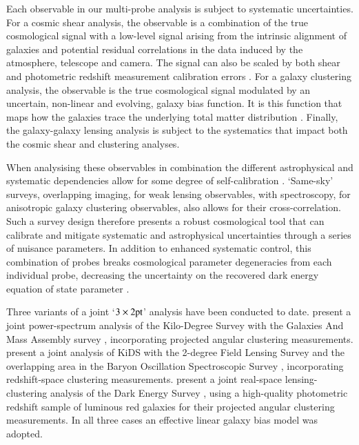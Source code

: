 Each observable in our multi-probe analysis is subject to systematic
uncertainties.  For a cosmic shear analysis, the observable is a
combination of the true cosmological signal with a low-level signal
arising from the intrinsic alignment of galaxies and potential residual
correlations in the data induced by the atmosphere, telescope and
camera.   The signal can also be scaled by both shear
 and photometric redshift measurement calibration errors
 \citep[see][and references therein]{mandelbaum:2018}.   For a galaxy
   clustering analysis, the observable is the true
   cosmological signal modulated by an uncertain, non-linear and
   evolving, galaxy bias function.  It is this function that maps how
   the galaxies trace the
   underlying total matter distribution \citep[see][and references
   therein]{desjacques/etal:2018}.   Finally, the galaxy-galaxy
   lensing analysis is subject to the systematics that impact both the
   cosmic shear and clustering analyses.

   When analysising these
   observables in combination
   the different astrophysical and systematic dependencies allow for some degree of
   self-calibration \citep{bernstein/jain:2004, hu/jain:2004,
     bernstein:2009,joachimi/bridle:2010}.  `Same-sky'
   surveys, overlapping imaging, for weak lensing observables, with
   spectroscopy, for anisotropic galaxy clustering observables,
   also allows for their cross-correlation.  Such a survey design therefore
   presents a robust
   cosmological tool that can calibrate and mitigate systematic and astrophysical
   uncertainties through a series of nuisance parameters.   In
   addition to enhanced systematic control, this combination of probes
   breaks cosmological parameter degeneracies from each individual
   probe, decreasing the
   uncertainty on the recovered dark energy equation of state
   parameter \citep{hu/jain:2004,gaztanaga/etal:2012}.

   Three variants of a joint `$3\times 2{\rm pt}$' analysis have been
   conducted to date.  \citet{vanuitert/etal:2018} present a joint power-spectrum
   analysis of the Kilo-Degree Survey \citep[KiDS,][]{kuijken/etal:2015} with
   the Galaxies And Mass Assembly survey
   \citep[GAMA,][]{liske/etal:2015}, incorporating projected
   angular clustering measurements.   \citet{joudaki/etal:2018}
   present a joint analysis of KiDS with the
   2-degree Field Lensing Survey \citep[2dFLenS,][]{blake/etal:2016}
   and the overlapping area in the Baryon Oscillation Spectroscopic Survey \citep[BOSS,][]{alam/etal:2015}, incorporating
   redshift-space clustering measurements.  \citet{abbott/etal:2018}
   present a joint real-space lensing-clustering analysis of the Dark
   Energy Survey \citep[DES,][]{drlicawagner/etal:2018}, using a high-quality
   photometric redshift sample of luminous red galaxies for their projected
   angular clustering measurements.  In all three cases an effective
   linear galaxy bias model was adopted.

